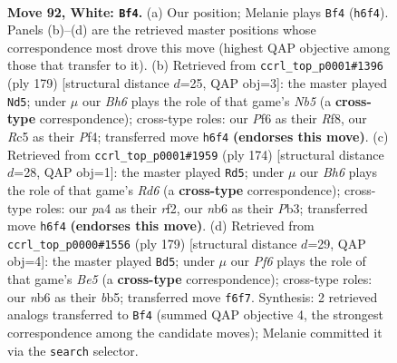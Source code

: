 \documentclass[11pt]{article}
\begin{document}
\clearpage

\begin{figure}[p]\centering
\begin{subfigure}{0.46\textwidth}\centering
\resizebox{\linewidth}{!}{%
\newchessgame
\chessboard[
  setfen={7k/3r4/1n3P1B/2R4P/p7/P7/7K/8 w - - 1 92},
  showmover=false,
  pgfstyle=straightmove, color=movearrow, markmove={h6-f4}
]}
\caption{}
\end{subfigure}\hfill
\begin{subfigure}{0.46\textwidth}\centering
\resizebox{\linewidth}{!}{%
\newchessgame
\chessboard[
  setfen={5r2/8/8/p7/Pn3pK1/1P3N2/7R/5k2 b - - 39 90},
  showmover=false,
  pgfstyle=straightmove, color=movearrow, markmove={b4-d5}
]}
\caption{}
\end{subfigure}
\\[4pt]
\begin{subfigure}{0.46\textwidth}\centering
\resizebox{\linewidth}{!}{%
\newchessgame
\chessboard[
  setfen={8/k7/P2R4/2p2p2/2P5/1P6/5r2/1K6 w - - 1 88},
  showmover=false,
  pgfstyle=straightmove, color=movearrow, markmove={d6-d5}
]}
\caption{}
\end{subfigure}\hfill
\begin{subfigure}{0.46\textwidth}\centering
\resizebox{\linewidth}{!}{%
\newchessgame
\chessboard[
  setfen={5k2/3R4/1p2p3/1B2b1K1/4b3/P7/8/8 b - - 13 90},
  showmover=false,
  pgfstyle=straightmove, color=movearrow, markmove={e4-d5}
]}
\caption{}
\end{subfigure}
\caption{\textbf{Move 92, White: \texttt{Bf4}.} (a) Our position; Melanie plays \texttt{Bf4} (\texttt{h6f4}). Panels (b)--(d) are the retrieved master positions whose correspondence most drove this move (highest QAP objective among those that transfer to it). (b) Retrieved from \texttt{ccrl\_top\_p0001\#1396} (ply 179) [structural distance $d$=25, QAP obj=3]: the master played \texttt{Nd5}; under $\mu$ our \emph{Bh6} plays the role of that game's \emph{Nb5} (a \textbf{cross-type} correspondence); cross-type roles: our \emph{P}f6 as their \emph{R}f8, our \emph{R}c5 as their \emph{P}f4; transferred move \texttt{h6f4} \textbf{(endorses this move)}. (c) Retrieved from \texttt{ccrl\_top\_p0001\#1959} (ply 174) [structural distance $d$=28, QAP obj=1]: the master played \texttt{Rd5}; under $\mu$ our \emph{Bh6} plays the role of that game's \emph{Rd6} (a \textbf{cross-type} correspondence); cross-type roles: our \emph{p}a4 as their \emph{r}f2, our \emph{n}b6 as their \emph{P}b3; transferred move \texttt{h6f4} \textbf{(endorses this move)}. (d) Retrieved from \texttt{ccrl\_top\_p0000\#1556} (ply 179) [structural distance $d$=29, QAP obj=4]: the master played \texttt{Bd5}; under $\mu$ our \emph{Pf6} plays the role of that game's \emph{Be5} (a \textbf{cross-type} correspondence); cross-type roles: our \emph{n}b6 as their \emph{b}b5; transferred move \texttt{f6f7}. Synthesis: 2 retrieved analogs transferred to \texttt{Bf4} (summed QAP objective 4, the strongest correspondence among the candidate moves); Melanie committed it via the \texttt{search} selector.}
\label{fig:thought-m182}
\end{figure}
\end{document}
